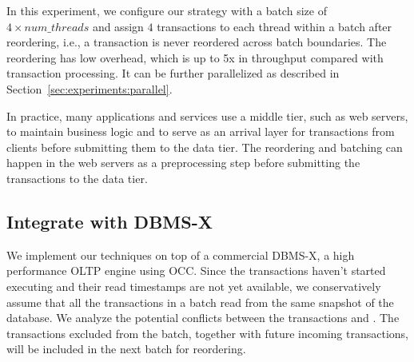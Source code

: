 {In this experiment, we configure our strategy with a batch size of $4\times num\_threads$ and assign $4$ transactions to each thread within a batch after reordering, i.e., a transaction is never reordered across batch boundaries. The reordering has low overhead, which is up to 5x in throughput compared with transaction processing. It can be further parallelized as described in Section~\ref{sec:experiments:parallel}.

In practice, many applications and services use a middle tier, such as web servers, to maintain business logic and to serve as an arrival layer for transactions from clients before submitting them to the data tier. The reordering and batching can happen in the web servers as a preprocessing step before submitting the transactions to the data tier.
}

\subsection{Integrate with DBMS-X}
\label{subsec:experiment:compare}

We implement our techniques on top of a commercial DBMS-X, a high performance OLTP engine using OCC.
 Since the transactions haven't started executing and their read timestamps are not yet available, we conservatively assume that all the transactions in a batch read from the same snapshot of the database. We analyze the potential conflicts between the transactions and . The transactions excluded from the batch, together with future incoming transactions, will be included in the next batch for reordering.


